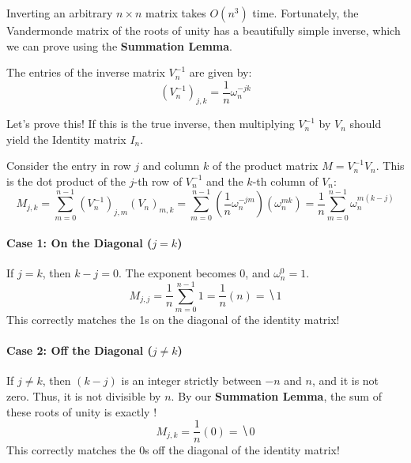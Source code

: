\documentclass[11  pt]{article}
\begin{document}
Inverting an arbitrary $n \times n$ matrix takes $O(n^3)$ time. Fortunately, the Vandermonde matrix of the roots of unity has a beautifully simple inverse, which we can prove using the \textbf{Summation Lemma}.

\begin{theorem}
The entries of the inverse matrix $V_n^{-1}$ are given by:
\begin{equation*}
    (V_n^{-1})_{j,k} = \frac{1}{n} \omega_n^{-jk}
\end{equation*}
\end{theorem}

\vs{0.5cm}
Let's prove this! If this is the true inverse, then multiplying $V_n^{-1}$ by $V_n$ should yield the Identity matrix $I_n$. 

Consider the entry in row $j$ and column $k$ of the product matrix $M = V_n^{-1} V_n$. This is the dot product of the $j$-th row of $V_n^{-1}$ and the $k$-th column of $V_n$:
\begin{equation*}
    M_{j,k} = \sum_{m=0}^{n-1} (V_n^{-1})_{j,m} (V_n)_{m,k} 
    = \sum_{m=0}^{n-1} \left( \frac{1}{n} \omega_n^{-jm} \right) \left( \omega_n^{mk} \right) 
    = \frac{1}{n} \sum_{m=0}^{n-1} \omega_n^{m(k-j)}
\end{equation*}

\vs{0.5cm}

\paragraph{Case 1: On the Diagonal ($j = k$)}
If $j=k$, then $k-j = 0$. The exponent becomes $0$, and $\omega_n^0 = 1$.
\begin{equation*}
    M_{j,j} = \frac{1}{n} \sum_{m=0}^{n-1} 1 = \frac{1}{n} (n) = \hide{1}
\end{equation*}
This correctly matches the 1s on the diagonal of the identity matrix!

\vs{0.5cm}

\paragraph{Case 2: Off the Diagonal ($j \neq k$)}
If $j \neq k$, then $(k-j)$ is an integer strictly between $-n$ and $n$, and it is not zero. Thus, it is not divisible by $n$.
By our \textbf{Summation Lemma}, the sum of these roots of unity is exactly ! 
\begin{equation*}
    M_{j,k} = \frac{1}{n} (0) = \hide{0}
\end{equation*}
This correctly matches the 0s off the diagonal of the identity matrix! 
\end{document}
